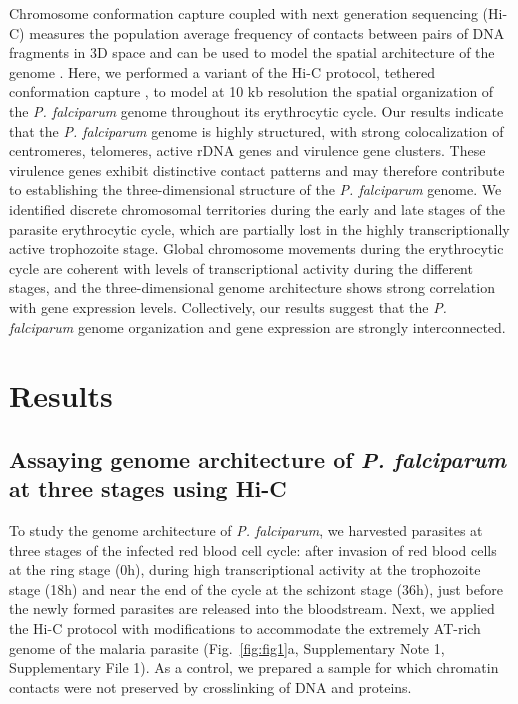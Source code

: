 Chromosome conformation capture coupled with next generation sequencing (Hi-C) measures the population average frequency of contacts between pairs of DNA fragments in 3D space and can be used to model the spatial architecture of the genome \citep{lieberman-aiden:comprehensive, duan:three-dimensional, kalhor:genome}. Here, we performed a variant of the Hi-C protocol, tethered conformation capture \citep{kalhor:genome}, to model at 10 kb resolution the spatial organization of the {\em P. falciparum} genome throughout its erythrocytic cycle. Our results indicate that the {\em P. falciparum} genome is highly structured, with strong colocalization of centromeres, telomeres, active rDNA genes and virulence gene clusters. These virulence genes exhibit distinctive contact patterns and may therefore contribute to establishing the three-dimensional structure of the {\em P. falciparum} genome. We identified discrete chromosomal territories during the early and late stages of the parasite erythrocytic cycle, which are partially lost in the highly transcriptionally active trophozoite stage. Global chromosome movements during the erythrocytic cycle are coherent with levels of transcriptional activity during the different stages, and the three-dimensional genome architecture shows strong correlation with gene expression levels. Collectively, our results suggest that the {\em P. falciparum} genome organization and gene expression are strongly interconnected.

\section*{Results}
\subsection*{Assaying genome architecture of {\em P. falciparum} at three stages using Hi-C}

To study the genome architecture of {\em P. falciparum}, we harvested parasites at three stages of the infected red blood cell cycle: after invasion of red blood cells at the ring stage (0h), during high transcriptional activity at the trophozoite stage (18h) and near the end of the cycle at the schizont stage (36h), just before the newly formed parasites are released into the bloodstream. Next, we applied the Hi-C protocol \citep{kalhor:genome} with modifications to accommodate the extremely AT-rich genome of the malaria parasite (Fig.~\ref{fig:fig1}a, Supplementary Note 1, Supplementary File 1). As a control, we prepared a sample for which chromatin contacts were not preserved by crosslinking of DNA and proteins.

